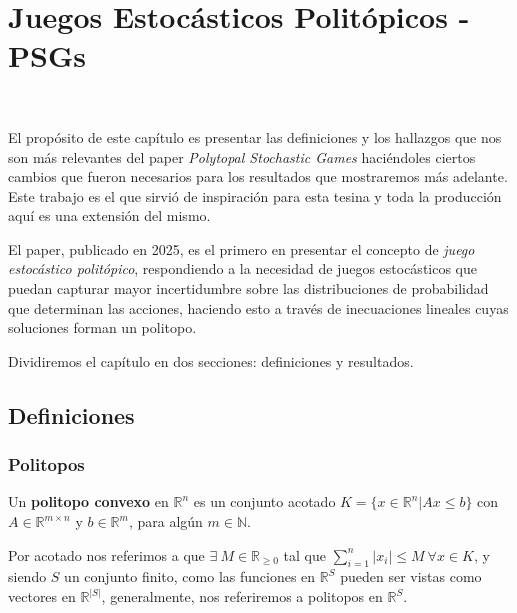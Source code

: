\chapter{Juegos Estocásticos Politópicos - PSGs}
~\label{cap:psg}

El propósito de este capítulo es presentar las definiciones y los hallazgos que
nos son más relevantes del paper \textit{Polytopal Stochastic Games}
\cite{Polytopal} haciéndoles ciertos cambios que fueron necesarios para los
resultados que mostraremos más adelante. Este trabajo es el que sirvió de
inspiración para esta tesina y toda la producción aquí es una extensión del
mismo.

El paper, publicado en 2025, es el primero en presentar el concepto de
\textit{juego estocástico politópico}, respondiendo a la necesidad de juegos
estocásticos que puedan capturar mayor incertidumbre sobre las distribuciones
de probabilidad que determinan las acciones, haciendo esto a través de
inecuaciones lineales cuyas soluciones forman un politopo.


Dividiremos el capítulo en dos secciones: definiciones y resultados.

\section{Definiciones}

\subsection*{Politopos}

Un \textbf{politopo convexo} en $\mathbb{R}^n$ es un conjunto acotado $K = \{ x
	\in \mathbb{R}^n | Ax \leq b\}$ con $A \in \mathbb{R}^{m\times n}$ y $ b \in
	\mathbb{R}^m$, para algún $m \in \mathbb{N}$.

Por acotado nos referimos a que $\exists \ M \in \mathbb{R}_{\geq 0}$ tal que
$\sum_{i=1}^{n} |x_i| \leq M \ \forall x \in K$, y siendo $S$ un conjunto
finito, como las funciones en $\mathbb{R}^S$ pueden ser vistas como vectores en
$\mathbb{R}^{|S|}$, generalmente, nos referiremos a politopos en
$\mathbb{R}^S$.


